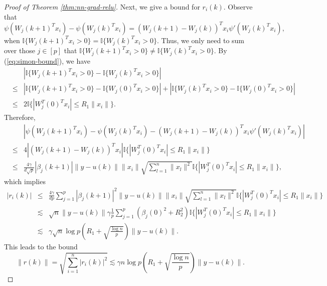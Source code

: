 \begin{proof}[Proof of Theorem \ref{thm:nn-grad-relu}]
Next, we give a bound for $r_i(k)$. Observe that
$$\psi(W_j(k+1)^Tx_i)-\psi(W_j(k)^Tx_i)=(W_j(k+1)-W_j(k))^Tx_i\psi'(W_j(k)^Tx_i),$$
when $\mathbb{I}\{W_j(k+1)^Tx_i>0\}=\mathbb{I}\{W_j(k)^Tx_i>0\}$. Thus, we only need to sum over those $j\in[p]$ that $\mathbb{I}\{W_j(k+1)^Tx_i>0\}\neq \mathbb{I}\{W_j(k)^Tx_i>0\}$. By (\ref{eq:simon-bound}), we have
\begin{eqnarray*}
&& \left|\mathbb{I}\{W_j(k+1)^Tx_i>0\}-\mathbb{I}\{W_j(k)^Tx_i>0\}\right| \\
&\leq& \left|\mathbb{I}\{W_j(k+1)^Tx_i>0\}-\mathbb{I}\{W_j(0)^Tx_i>0\}\right|+ \left|\mathbb{I}\{W_j(k)^Tx_i>0\}-\mathbb{I}\{W_j(0)^Tx_i>0\}\right| \\
&\leq& 2\mathbb{I}\{|W_j^T(0)^Tx_i|\leq R_1\|x_i\|\}.
\end{eqnarray*}
Therefore,
\begin{eqnarray*}
&& \left|\psi(W_j(k+1)^Tx_i)-\psi(W_j(k)^Tx_i)-(W_j(k+1)-W_j(k))^Tx_i\psi'(W_j(k)^Tx_i)\right| \\
&\leq& 4|(W_j(k+1)-W_j(k))^Tx_i|\mathbb{I}\{|W_j^T(0)^Tx_i|\leq R_1\|x_i\|\} \\
&\leq& \frac{4\gamma}{d\sqrt{p}}|\beta_j(k+1)|\|y-u(k)\|\|x_i\|\sqrt{\sum_{l=1}^n\|x_l\|^2}\mathbb{I}\{|W_j^T(0)^Tx_i|\leq R_1\|x_i\|\},
\end{eqnarray*}
which implies
\begin{eqnarray*}
|r_i(k)| &\leq& \frac{4\gamma}{dp}\sum_{j=1}^p|\beta_j(k+1)|^2\|y-u(k)\|\|x_i\|\sqrt{\sum_{l=1}^n\|x_l\|^2}\mathbb{I}\{|W_j^T(0)^Tx_i|\leq R_1\|x_i\|\} \\
&\lesssim& \sqrt{n}\|y-u(k)\|\gamma\frac{1}{p}\sum_{j=1}^p(\beta_j(0)^2+R_2^2)\mathbb{I}\{|W_j^T(0)^Tx_i|\leq R_1\|x_i\|\} \\
&\lesssim& \gamma\sqrt{n}\log p\left(R_1+\sqrt{\frac{\log n}{p}}\right)\|y-u(k)\|.
\end{eqnarray*}
This leads to the bound
\begin{equation}
\|r(k)\|=\sqrt{\sum_{i=1}^n|r_i(k)|^2}\lesssim \gamma n\log p\left(R_1+\sqrt{\frac{\log n}{p}}\right)\|y-u(k)\|.\label{eq:bound-res-k-relu}
\end{equation}


\end{proof}
